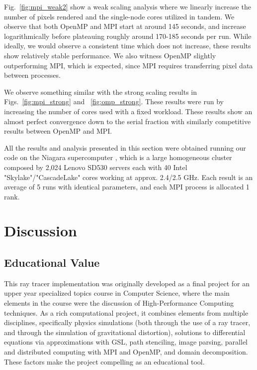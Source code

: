 Fig.~\ref{fig:mpi_weak2} show a weak scaling analysis where we linearly increase the number of pixels rendered and the single-node cores utilized in tandem. We observe that both OpenMP and MPI start at around 145 seconds, and increase logarithmically before plateauing roughly around 170-185 seconds per run. While ideally, we would observe a consistent time which does not increase, these results show relatively stable performance. We also witness OpenMP slightly outperforming MPI, which is expected, since MPI requires transferring pixel data between processes.

We observe something similar with the strong scaling results in Figs.~\ref{fig:mpi_strong} and ~\ref{fig:omp_strong}. These results were run by increasing the number of cores used with a fixed workload. These results show an almost perfect convergence down to the serial fraction with similarly competitive results between OpenMP and MPI.

All the results and analysis presented in this section were obtained
running our code on the Niagara supercomputer \cite{10.1145/3332186.3332195},
which is a large homogeneous cluster composed by 2,024 Lenovo SD530 servers
each with 40 Intel "Skylake"/"CascadeLake" cores working at approx. 2.4/2.5 GHz.
Each result is an average of 5 runs with identical parameters, and each MPI process is allocated 1 rank.



\section{Discussion}
\label{sec:disc}

\subsection{Educational Value}

This ray tracer implementation was originally developed as a final project for
an upper year specialized topics course in Computer Science, where the main
elements in the course were the discussion of High-Performance Computing
techniques.
As a rich computational project, it combines elements from multiple disciplines, specifically
physics simulations (both through the use of a ray tracer, and through the simulation of gravitational distortion),
solutions to differential equations via approximations with GSL,
path stenciling, image parsing,
parallel and distributed computing with MPI and OpenMP, and domain decomposition.
These factors make the project compelling as an educational tool.


